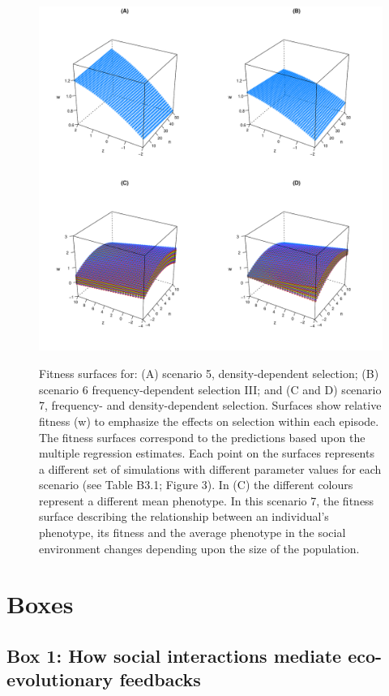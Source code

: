 \documentclass{article}
\begin{document}
\begin{figure} [H]
	\label{fig:sim3}
\end{figure}
\newpage
\begin{figure}  [H]
	\centering
	\includegraphics[width=12cm, height=12cm]{Figures/Fig5.pdf}
	\caption{Fitness surfaces for: (A) scenario 5, density-dependent selection; (B) scenario 6 frequency-dependent selection III; and (C and D) scenario 7, frequency- and density-dependent selection. Surfaces show relative fitness (w) to emphasize the effects on selection within each episode. The fitness surfaces correspond to the predictions based upon the multiple regression estimates. Each point on the surfaces represents a different set of simulations with different parameter values for each scenario (see Table B3.1; Figure 3). In (C) the different colours represent a different mean phenotype. In this scenario 7, the fitness surface describing the relationship between an individual's phenotype, its fitness and the average phenotype in the social environment changes depending upon the size of the population.} 
	\label{fig:surface}
\end{figure}


\newpage

\section{Boxes}

\subsection{Box 1: How social interactions mediate eco-evolutionary feedbacks}
\setcounter{figure}{0} 
\end{document}

